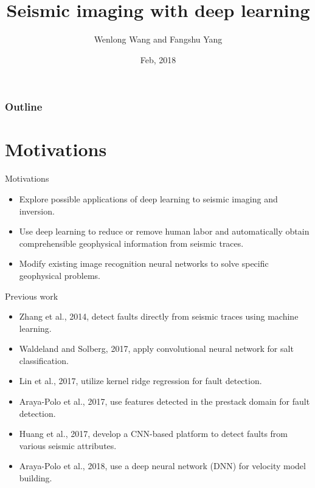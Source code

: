 \documentclass[aspectratio=169]{beamer}
\title[Machine Learning]{Seismic imaging with deep learning}
\author[W. Wang]{Wenlong Wang and Fangshu Yang}
\institute[HIT]{Harbin Institute of Technology}
\date[Feb 2018]{Feb, 2018}
\begin{document}



\begin{frame}[plain]
  \titlepage
\end{frame}

\begin{frame}
\frametitle{Outline}
\tableofcontents
\end{frame}
\section{Motivations}
\begin{frame}{Motivations}
\begin{itemize}
\item{Explore possible applications of deep learning to seismic imaging and inversion.}
\item{Use deep learning to reduce or remove human labor and automatically obtain comprehensible geophysical information from seismic traces.}
\item{Modify existing image recognition neural networks to solve specific geophysical problems.}
\end{itemize}
\end{frame}
\begin{frame}{Previous work}
\begin{itemize}
\item{Zhang et al., 2014, detect faults directly from seismic traces using machine learning.}
\item{Waldeland and Solberg, 2017, apply convolutional neural network for salt classification.}
\item{Lin et al., 2017, utilize kernel ridge regression for fault detection.}
\item{Araya-Polo et al., 2017, use features detected in the prestack domain for fault detection.}
\item{Huang et al., 2017, develop a CNN-based platform to detect faults from various seismic attributes.}
\item{Araya-Polo et al., 2018, use a deep neural network (DNN) for velocity model building.}
\end{itemize}
\end{frame}
\end{document}
